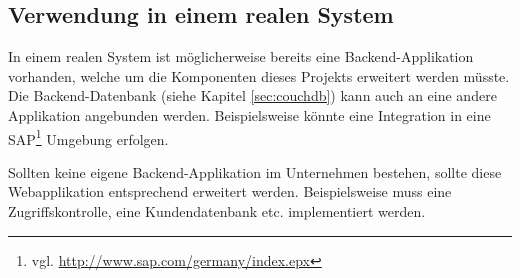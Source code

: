 \subsection{Verwendung in einem realen System}

In einem realen System ist möglicherweise bereits eine Backend-Applikation
	vorhanden, welche um die Komponenten dieses Projekts erweitert werden
	müsste. Die Backend-Datenbank (siehe Kapitel \ref{sec:couchdb}) kann
	auch an eine andere Applikation angebunden werden. Beispielsweise
	könnte eine Integration in eine SAP\footnote{vgl.
	\url{http://www.sap.com/germany/index.epx}} Umgebung erfolgen.
	
Sollten keine eigene Backend-Applikation im Unternehmen bestehen, sollte
	diese Webapplikation entsprechend erweitert werden. Beispielsweise
	muss eine Zugriffskontrolle, eine Kundendatenbank etc. implementiert
	werden.